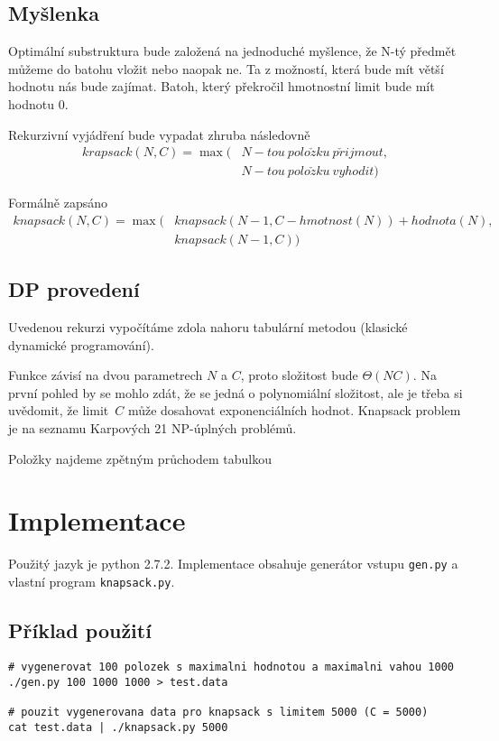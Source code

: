 \documentclass[11pt]{article}
\begin{document}
\subsection{Myšlenka}
Optimální substruktura bude založená na jednoduché myšlence, že N-tý
předmět můžeme do batohu vložit nebo naopak ne. Ta z možností, která bude mít 
větší hodnotu nás bude zajímat. Batoh, který překročil hmotnostní limit bude 
mít hodnotu $0$.

Rekurzivní vyjádření bude vypadat zhruba následovně
\begin{align*}
krapsack(N, C) = \max(&N-tou\ polo\check{z}ku\ p\check{r}ijmout, \\
&N-tou\ polo\check{z}ku\ vyhodit)
\end{align*}

Formálně zapsáno 
\begin{align*}
knapsack(N, C) = \max(&knapsack(N - 1, C - hmotnost(N)) + hodnota(N), \\
&knapsack(N - 1, C))
\end{align*}



\vspace{.5cm}
\subsection{DP provedení}
Uvedenou rekurzi vypočítáme zdola nahoru tabulární metodou (klasické dynamické
programování). 

Funkce závisí na dvou parametrech $N$ a $C$, proto složitost
bude $\Theta (NC)$. Na první pohled by se mohlo zdát, že se jedná o polynomiální
složitost, ale je třeba si uvědomit, že limit~$C$ může dosahovat exponenciálních
hodnot. {\sc Knapsack problem} je na seznamu Karpových 21 NP-úplných problémů.
\cite{wiki}


\clearpage
Položky najdeme zpětným průchodem tabulkou


\section{Implementace}
Použitý jazyk je python 2.7.2. Implementace obsahuje generátor vstupu 
{\tt gen.py} a vlastní program {\tt knapsack.py}.

\subsection{Příklad použití}
\begin{verbatim}
# vygenerovat 100 polozek s maximalni hodnotou a maximalni vahou 1000
./gen.py 100 1000 1000 > test.data

# pouzit vygenerovana data pro knapsack s limitem 5000 (C = 5000)
cat test.data | ./knapsack.py 5000
\end{verbatim}
\end{document}
